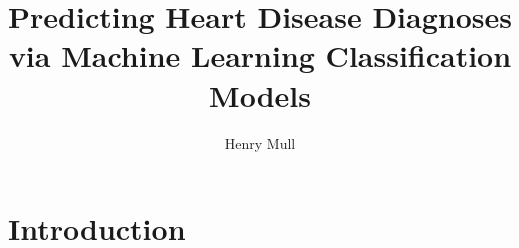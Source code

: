 \documentclass[12pt]{article}
\title{Predicting Heart Disease Diagnoses via Machine Learning Classification Models}
\author{Henry Mull}
\date{}
\begin{document}
\maketitle









\section*{Introduction}


\end{document}
